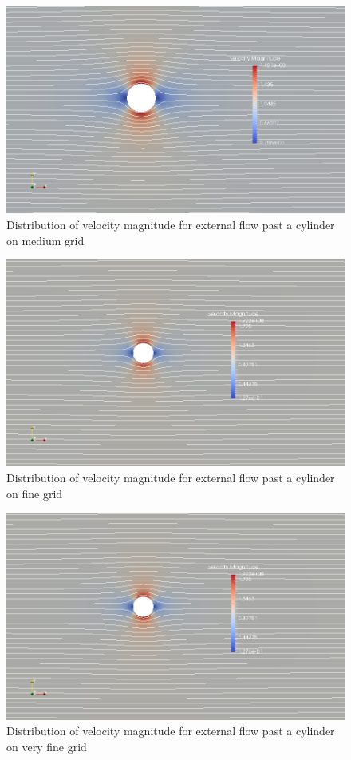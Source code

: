 \documentclass[12pt]{elsarticle}
\begin{document}
	\begin{figure}[h] \label{cyl__velm_med}
		\centering\includegraphics[width=1.0\linewidth]{velm_med}
		\caption{Distribution of velocity magnitude for external flow past a cylinder on medium grid}
	\end{figure}
	
	\begin{figure}[h] \label{cyl__velm_fin}
		\centering\includegraphics[width=1.0\linewidth]{velm_fin}
		\caption{Distribution of velocity magnitude for external flow past a cylinder on fine grid}
	\end{figure}
	
	\begin{figure}[h] \label{cyl__velm_vfin}
		\centering\includegraphics[width=1.0\linewidth]{velm_fin}
		\caption{Distribution of velocity magnitude for external flow past a cylinder on very fine grid}
	\end{figure}
	\clearpage
	
\end{document}
